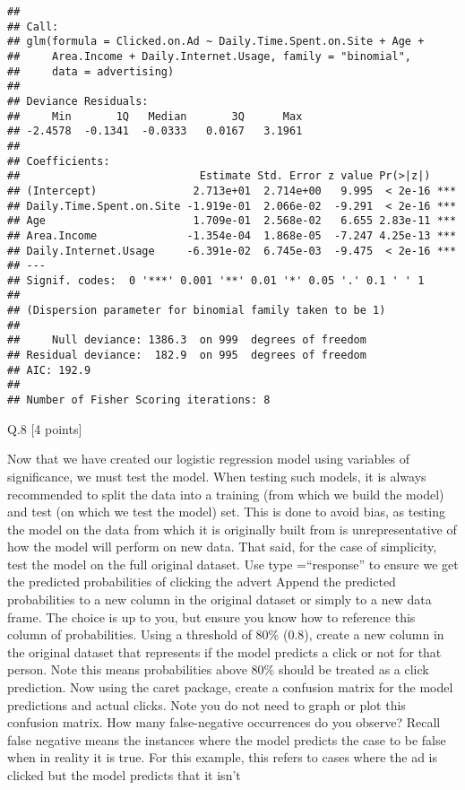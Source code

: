 \documentclass[]{article}
\begin{document}
\begin{verbatim}
## 
## Call:
## glm(formula = Clicked.on.Ad ~ Daily.Time.Spent.on.Site + Age + 
##     Area.Income + Daily.Internet.Usage, family = "binomial", 
##     data = advertising)
## 
## Deviance Residuals: 
##     Min       1Q   Median       3Q      Max  
## -2.4578  -0.1341  -0.0333   0.0167   3.1961  
## 
## Coefficients:
##                            Estimate Std. Error z value Pr(>|z|)    
## (Intercept)               2.713e+01  2.714e+00   9.995  < 2e-16 ***
## Daily.Time.Spent.on.Site -1.919e-01  2.066e-02  -9.291  < 2e-16 ***
## Age                       1.709e-01  2.568e-02   6.655 2.83e-11 ***
## Area.Income              -1.354e-04  1.868e-05  -7.247 4.25e-13 ***
## Daily.Internet.Usage     -6.391e-02  6.745e-03  -9.475  < 2e-16 ***
## ---
## Signif. codes:  0 '***' 0.001 '**' 0.01 '*' 0.05 '.' 0.1 ' ' 1
## 
## (Dispersion parameter for binomial family taken to be 1)
## 
##     Null deviance: 1386.3  on 999  degrees of freedom
## Residual deviance:  182.9  on 995  degrees of freedom
## AIC: 192.9
## 
## Number of Fisher Scoring iterations: 8
\end{verbatim}

Q.8 {[}4 points{]}

Now that we have created our logistic regression model using variables
of significance, we must test the model. When testing such models, it is
always recommended to split the data into a training (from which we
build the model) and test (on which we test the model) set. This is done
to avoid bias, as testing the model on the data from which it is
originally built from is unrepresentative of how the model will perform
on new data. That said, for the case of simplicity, test the model on
the full original dataset. Use type =``response'' to ensure we get the
predicted probabilities of clicking the advert Append the predicted
probabilities to a new column in the original dataset or simply to a new
data frame. The choice is up to you, but ensure you know how to
reference this column of probabilities. Using a threshold of 80\% (0.8),
create a new column in the original dataset that represents if the model
predicts a click or not for that person. Note this means probabilities
above 80\% should be treated as a click prediction. Now using the caret
package, create a confusion matrix for the model predictions and actual
clicks. Note you do not need to graph or plot this confusion matrix. How
many false-negative occurrences do you observe? Recall false negative
means the instances where the model predicts the case to be false when
in reality it is true. For this example, this refers to cases where the
ad is clicked but the model predicts that it isn't
\end{document}
